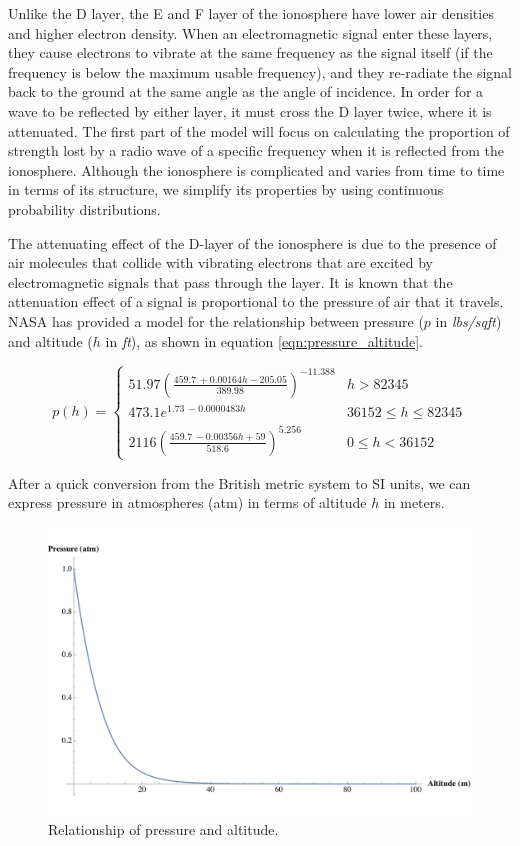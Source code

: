 \documentclass{article}
\begin{document}
Unlike the D layer, the E and F layer of the ionosphere have lower air densities and higher electron density. When an electromagnetic signal enter these layers, they cause electrons to vibrate at the same frequency as the signal itself (if the frequency is below the maximum usable frequency), and they re-radiate the signal back to the ground at the same angle as the angle of incidence. In order for a wave to be reflected by either layer, it must cross the D layer twice, where it is attenuated. The first part of the model will focus on calculating the proportion of strength lost by a radio wave of a specific frequency when it is reflected from the ionosphere. Although the ionosphere is complicated and varies from time to time in terms of its structure, we simplify its properties by using continuous probability distributions.

The attenuating effect of the D-layer of the ionosphere is due to the presence of air molecules that collide with vibrating electrons that are excited by electromagnetic signals that pass through the layer. It is known that the attenuation effect of a signal is proportional to the pressure of air that it travels. NASA has provided a model for the relationship between pressure ($p$ in \emph{lbs/sqft}) and altitude ($h$ in \emph{ft}), as shown in equation \eqref{eqn:pressure_altitude}.

\begin{equation}\label{eqn:pressure_altitude}
p(h) =\begin{cases}
51.97\left(\frac{459.7\, +0.00164 h-205.05}{389.98}\right)^{-11.388} & h>82345 \\[14pt]
 473.1 e^{1.73\, -0.0000483 h} & 36152\leq h\leq 82345 \\[12pt]
 2116 \left(\frac{459.7\, -0.00356 h+59}{518.6}\right)^{5.256} & 0\leq h<36152
\end{cases}
\end{equation}

After a quick conversion from the British metric system to SI units, we can express pressure in atmospheres (atm) in terms of altitude $h$ in meters.

\begin{figure}[htbp]
    \centering
    \includegraphics[scale=.6,clip,trim=0 30 0 15]{pressure_plot_2d.pdf}
    \caption{Relationship of pressure and altitude.}
    \label{fig:pressure_plot_2d}
\end{figure}
\end{document}
